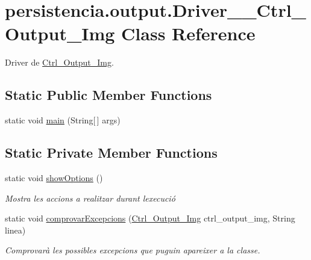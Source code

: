 \hypertarget{classpersistencia_1_1output_1_1Driver____Ctrl__Output__Img}{}\section{persistencia.\+output.\+Driver\+\_\+\+\_\+\+Ctrl\+\_\+\+Output\+\_\+\+Img Class Reference}
\label{classpersistencia_1_1output_1_1Driver____Ctrl__Output__Img}


Driver de \hyperlink{classpersistencia_1_1output_1_1Ctrl__Output__Img}{Ctrl\+\_\+\+Output\+\_\+\+Img}.  


\subsection*{Static Public Member Functions}
\begin{DoxyCompactItemize}
\item 
static void \hyperlink{classpersistencia_1_1output_1_1Driver____Ctrl__Output__Img_a7ea6be01dbe68f043b4fb50b7ba41f8b}{main} (String\mbox{[}$\,$\mbox{]} args)
\end{DoxyCompactItemize}
\subsection*{Static Private Member Functions}
\begin{DoxyCompactItemize}
\item 
static void \hyperlink{classpersistencia_1_1output_1_1Driver____Ctrl__Output__Img_a407a2c1e80b099b7cae5dd0a19683d09}{show\+Options} ()
\begin{DoxyCompactList}\small\item\em Mostra les accions a realitzar durant l\textquotesingle{}execució \end{DoxyCompactList}\item 
static void \hyperlink{classpersistencia_1_1output_1_1Driver____Ctrl__Output__Img_ab6af9c875a2582dbb7e466be9bb6bbbb}{comprovar\+Excepcions} (\hyperlink{classpersistencia_1_1output_1_1Ctrl__Output__Img}{Ctrl\+\_\+\+Output\+\_\+\+Img} ctrl\+\_\+output\+\_\+img, String linea)
\begin{DoxyCompactList}\small\item\em Comprovarà les possibles excepcions que puguin apareixer a la classe. \end{DoxyCompactList}\end{DoxyCompactItemize}


